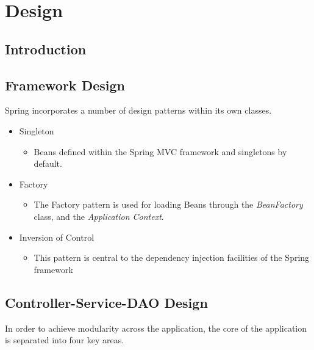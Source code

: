 \chapter{Design}
\label{design}

\section{Introduction}

\section{Framework Design}

Spring incorporates a number of design patterns within its own classes. 

\begin{table}[H]
\begin{itemize}
\item Singleton
\begin{itemize}
\item Beans defined within the Spring MVC framework and singletons by default. 
\end{itemize}
\item Factory
\begin{itemize}
\item The Factory pattern is used for loading Beans through the \textit{BeanFactory} class, and the \textit{Application Context}. 
\end{itemize}
\item Inversion of Control
\begin{itemize}
\item This pattern is central to the dependency injection facilities of the Spring framework
\end{itemize}
\end{itemize}
\label{fig:springdesignpatterns}
\end{table}

\section{Controller-Service-DAO Design}

In order to achieve modularity across the application, the core of the application is separated into four key areas.

